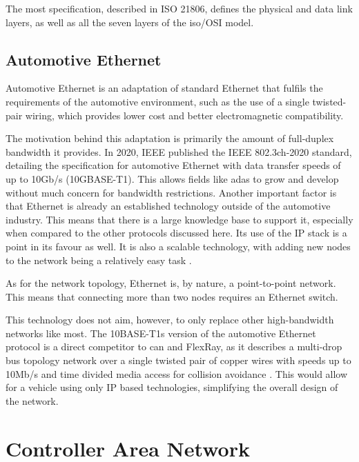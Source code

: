The \gls{most} specification, described in ISO 21806, defines the physical and data link layers, as well as all the seven layers of the \gls{iso}/OSI model.

\subsection{Automotive Ethernet}

Automotive Ethernet is an adaptation of standard Ethernet that fulfils the requirements of the automotive environment, such as the use of a single twisted-pair wiring, which provides lower cost and better electromagnetic compatibility.\par

The motivation behind this adaptation is primarily the amount of full-duplex bandwidth it provides. In 2020, IEEE published the IEEE 802.3ch-2020 standard, detailing the specification for automotive Ethernet with data transfer speeds of up to 10Gb/s (10GBASE-T1). This allows fields like \gls{adas} to grow and develop without much concern for bandwidth restrictions. Another important factor is that Ethernet is already an established technology outside of the automotive industry. This means that there is a large knowledge base to support it, especially when compared to the other protocols discussed here. Its use of the IP stack is a point in its favour as well. It is also a scalable technology, with adding new nodes to the network being a relatively easy task \citep{Bello2011}.\par

As for the network topology, Ethernet is, by nature, a point-to-point network. This means that connecting more than two nodes requires an Ethernet switch.\par

This technology does not aim, however, to only replace other high-bandwidth networks like \gls{most}. The 10BASE-T1s version of the automotive Ethernet protocol is a direct competitor to \gls{can} and FlexRay, as it describes a multi-drop bus topology network over a single twisted pair of copper wires with speeds up to 10Mb/s and time divided media access for collision avoidance \citep{AutomotiveNetworks}. This would allow for a vehicle using only IP based technologies, simplifying the overall design of the network.

\section{Controller Area Network}
\label{s:can}


